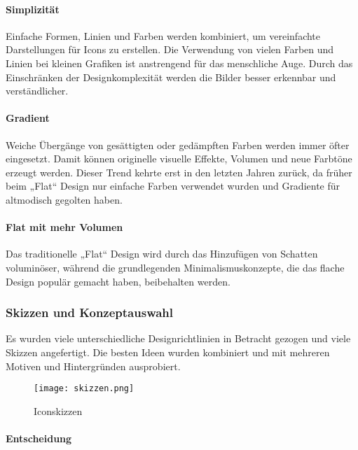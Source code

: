 \paragraph{Simplizität}
Einfache Formen, Linien und Farben werden kombiniert, um vereinfachte Darstellungen für Icons zu erstellen. Die Verwendung von vielen Farben und Linien bei kleinen Grafiken ist anstrengend für das menschliche Auge. Durch das Einschränken der Designkomplexität werden die Bilder besser erkennbar und verständlicher.

\paragraph{Gradient}
Weiche Übergänge von gesättigten oder gedämpften Farben werden immer öfter eingesetzt. Damit können originelle visuelle Effekte, Volumen und neue Farbtöne erzeugt werden. Dieser Trend kehrte erst in den letzten Jahren zurück, da früher beim „Flat“ Design nur einfache Farben verwendet wurden und Gradiente für altmodisch gegolten haben. 

\paragraph{Flat mit mehr Volumen}
Das traditionelle „Flat“ Design wird durch das Hinzufügen von Schatten voluminöser, während die grundlegenden Minimalismuskonzepte, die das flache Design populär gemacht haben, beibehalten werden.



\subsubsection{Skizzen und Konzeptauswahl} 

Es wurden viele unterschiedliche Designrichtlinien in Betracht gezogen und viele Skizzen angefertigt. Die besten Ideen wurden kombiniert und mit mehreren Motiven und Hintergründen ausprobiert.

\begin{figure}[H] \centering \texttt{[image: skizzen.png]} \caption{Iconskizzen} \end{figure} 


\paragraph{Entscheidung} 

